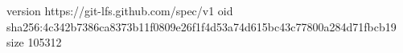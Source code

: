 version https://git-lfs.github.com/spec/v1
oid sha256:4c342b7386ca8373b11f0809e26f1f4d53a74d615bc43c77800a284d71fbcb19
size 105312
